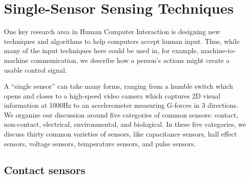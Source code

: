 \section{Single-Sensor Sensing Techniques}

One key research area in Human Computer Interaction is designing new techniques and algorithms to help computers accept human input. Thus, while many of the input techniques here could be used in, for example, machine-to-machine communication, we describe how a person's actions might create a usable control signal.

 A ``single sensor'' can take many forms, ranging from a humble switch which opens and closes to a high-speed video camera which captures 2D visual information at 1000Hz to an accelerometer measuring G-forces in 3 directions.
We organize our discussion around five categories of common sensors: contact, non-contact, electrical, environmental, and biological. In these five categories, we discuss thirty common varieties of sensors, like capacitance sensors, hall effect sensors, voltage sensors, temperature sensors, and pulse sensors.



\subsection{Contact sensors}

